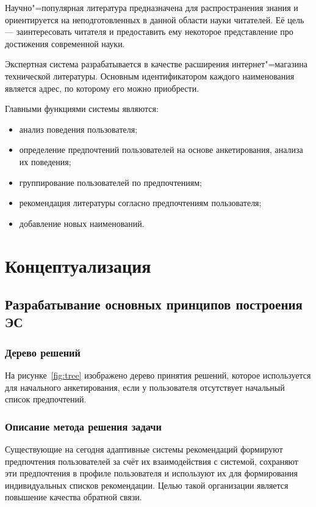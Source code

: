 \documentclass[simple,14pt,utf8,russian]{eskdtext}
\begin{document}
    Научно"=популярная литература предназначена для распространения знания и ориентируется на неподготовленных в
    данной области науки читателей.
    Её цель ---  заинтересовать читателя и предоставить ему некоторое представление про достижения современной науки.

    Экспертная система разрабатывается в качестве расширения интернет"=магазина технической литературы.
    Основным идентификатором каждого наименования является адрес, по которому его можно приобрести.

    Главными функциями системы являются:
    \begin{itemize}
        \item анализ поведения пользователя;
        \item определение предпочтений пользователей на основе анкетирования, анализа их поведения;
        \item группирование пользователей по предпочтениям;
        \item рекомендация литературы согласно предпочтениям пользователя;
        \item добавление новых наименований.
    \end{itemize}
    \clearpage
\section{Концептуализация}
\label{chap:concept}
    \subsection{Разрабатывание основных принципов построения ЭС}
    \label{sec:principles}
        \subsubsection{Дерево решений}
        \label{ssec:tree}
            На рисунке~\ref{fig:tree} изображено дерево принятия решений, которое используется для начального
            анкетирования, если у пользователя отсутствует начальный список предпочтений.
        \subsubsection{Описание метода решения задачи}
        \label{ssec:method}
            Существующие на сегодня адаптивные системы рекомендаций формируют предпочтения пользователей за счёт их
            взаимодействия с системой, сохраняют эти предпочтения в профиле пользователя и используют их для
            формирования индивидуальных списков рекомендации.
            Целью такой организации является повышение качества обратной связи.~\cite{book3}
\end{document}
